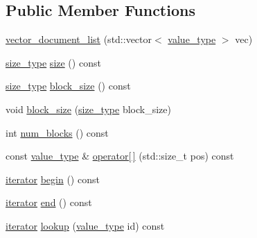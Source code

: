 \subsection*{Public Member Functions}
\begin{DoxyCompactItemize}
\item 
\mbox{\hyperlink{classirk_1_1vector__document__list_aee7fc8d2b55075dca80eb883fe5cd0dc}{vector\+\_\+document\+\_\+list}} (std\+::vector$<$ \mbox{\hyperlink{classirk_1_1vector__document__list_a0ec9c56f5e12a3a9101b5a18b2fbe69f}{value\+\_\+type}} $>$ vec)
\item 
\mbox{\hyperlink{classirk_1_1vector__document__list_ac9387bd9f5dc89b638b6295858a9268c}{size\+\_\+type}} \mbox{\hyperlink{classirk_1_1vector__document__list_ad7eac494d9c0aa784efaa1a4faa47616}{size}} () const
\item 
\mbox{\hyperlink{classirk_1_1vector__document__list_ac9387bd9f5dc89b638b6295858a9268c}{size\+\_\+type}} \mbox{\hyperlink{classirk_1_1vector__document__list_ae6a0a3b41d660778ab8dae0e432a47b1}{block\+\_\+size}} () const
\item 
void \mbox{\hyperlink{classirk_1_1vector__document__list_a1e835fe551a310ba89749812b2e9ea1f}{block\+\_\+size}} (\mbox{\hyperlink{classirk_1_1vector__document__list_ac9387bd9f5dc89b638b6295858a9268c}{size\+\_\+type}} block\+\_\+size)
\item 
int \mbox{\hyperlink{classirk_1_1vector__document__list_ab2ab2cef0d517240605010570f7765e8}{num\+\_\+blocks}} () const
\item 
const \mbox{\hyperlink{classirk_1_1vector__document__list_a0ec9c56f5e12a3a9101b5a18b2fbe69f}{value\+\_\+type}} \& \mbox{\hyperlink{classirk_1_1vector__document__list_a005d5854e07f49ade87827544cc88d7f}{operator\mbox{[}$\,$\mbox{]}}} (std\+::size\+\_\+t pos) const
\item 
\mbox{\hyperlink{classirk_1_1vector__document__list_a42499af78a7d66a1b626858cd424600f}{iterator}} \mbox{\hyperlink{classirk_1_1vector__document__list_a014b3737e63a4472e66ccb90a515f340}{begin}} () const
\item 
\mbox{\hyperlink{classirk_1_1vector__document__list_a42499af78a7d66a1b626858cd424600f}{iterator}} \mbox{\hyperlink{classirk_1_1vector__document__list_adafc0267ab0f84e5240011c96efd9681}{end}} () const
\item 
\mbox{\hyperlink{classirk_1_1vector__document__list_a42499af78a7d66a1b626858cd424600f}{iterator}} \mbox{\hyperlink{classirk_1_1vector__document__list_af25b19f3edd8c826dea2c2a8523c2772}{lookup}} (\mbox{\hyperlink{classirk_1_1vector__document__list_a0ec9c56f5e12a3a9101b5a18b2fbe69f}{value\+\_\+type}} id) const
\end{DoxyCompactItemize}


